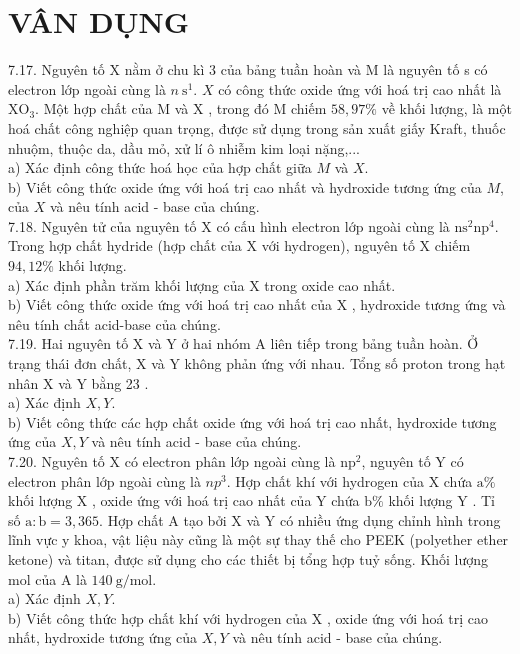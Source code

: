 \documentclass[10pt]{article}
\begin{document}
\section*{VÂN DỤNG}
7.17. Nguyên tố X nằm ở chu kì 3 của bảng tuần hoàn và M là nguyên tố s có electron lớp ngoài cùng là $n \mathrm{~s}^{1}$. $X$ có công thức oxide ứng với hoá trị cao nhất là $\mathrm{XO}_{3}$. Một hợp chất của M và X , trong đó M chiếm $58,97 \%$ về khối lượng, là một hoá chất công nghiệp quan trọng, được sử dụng trong sản xuất giấy Kraft, thuốc nhuộm, thuộc da, dầu mỏ, xử lí ô nhiễm kim loại nặng,...\\
a) Xác định công thức hoá học của hợp chất giữa $M$ và $X$.\\
b) Viết công thức oxide ứng với hoá trị cao nhất và hydroxide tương ứng của $M$, của $X$ và nêu tính acid - base của chúng.\\
7.18. Nguyên tử của nguyên tố X có cấu hình electron lớp ngoài cùng là $\mathrm{ns}^{2} \mathrm{np}^{4}$. Trong hợp chất hydride (hợp chất của X với hydrogen), nguyên tố X chiếm $94,12 \%$ khối lượng.\\
a) Xác định phần trăm khối lượng của X trong oxide cao nhất.\\
b) Viết công thức oxide ứng với hoá trị cao nhất của X , hydroxide tương ứng và nêu tính chất acid-base của chúng.\\
7.19. Hai nguyên tố X và Y ở hai nhóm A liên tiếp trong bảng tuần hoàn. Ở trạng thái đơn chất, X và Y không phản ứng với nhau. Tổng số proton trong hạt nhân X và Y bằng 23 .\\
a) Xác định $X, Y$.\\
b) Viết công thức các hợp chất oxide ứng với hoá trị cao nhất, hydroxide tương ứng của $X, Y$ và nêu tính acid - base của chúng.\\
7.20. Nguyên tố X có electron phân lớp ngoài cùng là $\mathrm{np}^{2}$, nguyên tố Y có electron phân lớp ngoài cùng là $n p^{3}$. Hợp chất khí với hydrogen của X chứa $\mathrm{a} \%$ khối lượng X , oxide ứng với hoá trị cao nhất của Y chứa $\mathrm{b} \%$ khối lượng Y . Tỉ số $\mathrm{a}: \mathrm{b}=3,365$. Hợp chất A tạo bởi X và Y có nhiều ứng dụng chỉnh hình trong lĩnh vực y khoa, vật liệu này cũng là một sự thay thế cho PEEK (polyether ether ketone) và titan, được sử dụng cho các thiết bị tổng hợp tuỷ sống. Khối lượng mol của A là $140 \mathrm{~g} / \mathrm{mol}$.\\
a) Xác định $X, Y$.\\
b) Viết công thức hợp chất khí với hydrogen của X , oxide ứng với hoá trị cao nhất, hydroxide tương ứng của $X, Y$ và nêu tính acid - base của chúng.
\end{document}
